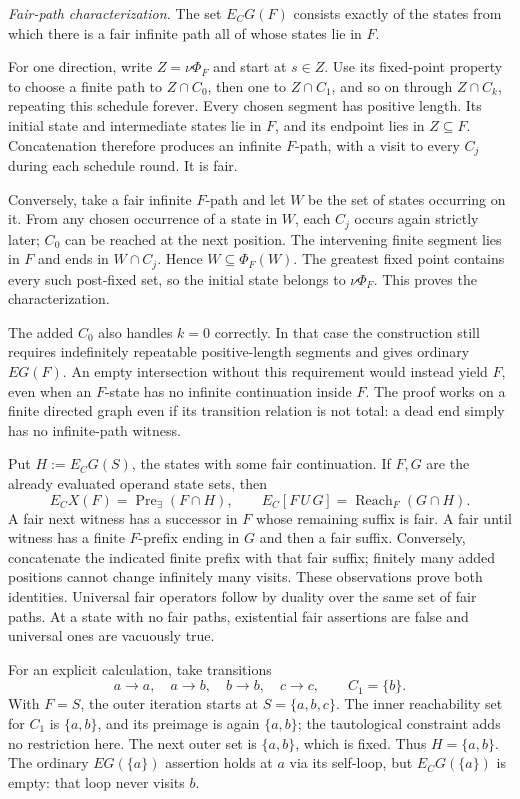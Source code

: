 \emph{Fair-path characterization.}
The set \(E_CG(F)\) consists exactly of the states from which there is
a fair infinite path all of whose states lie in \(F\).

For one direction, write \(Z=\nu\Phi_F\) and start at \(s\in Z\).
Use its fixed-point property to choose a finite path to \(Z\cap C_0\),
then one to \(Z\cap C_1\), and so on through \(Z\cap C_k\), repeating
this schedule forever. Every chosen segment has positive length.
Its initial state and intermediate states lie in \(F\), and its
endpoint lies in \(Z\subseteq F\). Concatenation therefore produces
an infinite \(F\)-path, with a visit to every \(C_j\) during each
schedule round. It is fair.

Conversely, take a fair infinite \(F\)-path and let \(W\) be the set
of states occurring on it. From any chosen occurrence of a state
in \(W\), each \(C_j\) occurs again strictly later; \(C_0\) can be
reached at the next position. The intervening finite segment lies
in \(F\) and ends in \(W\cap C_j\). Hence \(W\subseteq\Phi_F(W)\).
The greatest fixed point contains every such post-fixed set, so the
initial state belongs to \(\nu\Phi_F\). This proves the characterization.

The added \(C_0\) also handles \(k=0\) correctly. In that case the
construction still requires indefinitely repeatable positive-length
segments and gives ordinary \(EG(F)\). An empty intersection without
this requirement would instead yield \(F\), even when an \(F\)-state
has no infinite continuation inside \(F\).
The proof works on a finite directed graph even if its transition
relation is not total: a dead end simply has no infinite-path witness.

Put \(H:=E_CG(S)\), the states with some fair continuation.
If \(F,G\) are the already evaluated operand state sets, then
\[
 E_CX(F)=\operatorname{Pre}_{\exists}(F\cap H),
 \qquad
 E_C[F\,U\,G]=\operatorname{Reach}_F(G\cap H).
\]
A fair next witness has a successor in \(F\) whose remaining suffix
is fair. A fair until witness has a finite \(F\)-prefix ending in
\(G\) and then a fair suffix. Conversely, concatenate the indicated
finite prefix with that fair suffix; finitely many added positions
cannot change infinitely many visits. These observations prove both
identities. Universal fair operators follow by duality over the same
set of fair paths. At a state with no fair paths, existential fair
assertions are false and universal ones are vacuously true.

For an explicit calculation, take transitions
\[
 a\to a,\quad a\to b,\quad b\to b,\quad c\to c,
 \qquad C_1=\{b\}.
\]
With \(F=S\), the outer iteration starts at \(S=\{a,b,c\}\).
The inner reachability set for \(C_1\) is \(\{a,b\}\), and its
preimage is again \(\{a,b\}\); the tautological constraint adds
no restriction here. The next outer set is \(\{a,b\}\), which is
fixed. Thus \(H=\{a,b\}\). The ordinary \(EG(\{a\})\) assertion
holds at \(a\) via its self-loop, but \(E_CG(\{a\})\) is empty:
that loop never visits \(b\).

